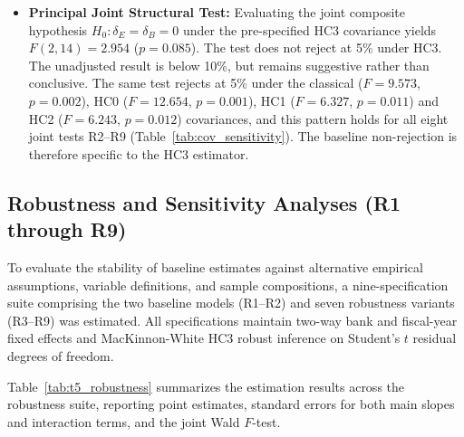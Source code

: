 \begin{itemize}
    \textit{Hypothesis Statement:} The value relevance of book value per share underwent a statistically significant shift following the 2023 consolidation wave ($H_0: \delta_B = 0$ vs.\ $H_1: \delta_B \ne 0$).
    The interaction coefficient is $\hat{\delta}_B = -1.758$ with an HC3 standard error of $1.231$ ($t = -1.43, p = 0.175$). Although the negative shift reduces the implied post-consolidation slope to $-1.658$, the interaction term does not achieve statistical significance at the 5\% level. The study fails to reject the null hypothesis of no structural shift in BVPS value relevance when evaluated in isolation.
    \item \textbf{Principal Joint Structural Test:}
    Evaluating the joint composite hypothesis $H_0: \delta_E = \delta_B = 0$ under the pre-specified HC3 covariance yields $F(2,14)=2.954$ ($p=0.085$). The test does not reject at 5\% under HC3. The unadjusted result is below 10\%, but remains suggestive rather than conclusive. The same test rejects at 5\% under the classical ($F=9.573$, $p=0.002$), HC0 ($F=12.654$, $p=0.001$), HC1 ($F=6.327$, $p=0.011$) and HC2 ($F=6.243$, $p=0.012$) covariances, and this pattern holds for all eight joint tests R2--R9 (Table~\ref{tab:cov_sensitivity}). The baseline non-rejection is therefore specific to the HC3 estimator.
\end{itemize}

\subsection{Robustness and Sensitivity Analyses (R1 through R9)}
\label{subsec:robustness_suite}
To evaluate the stability of baseline estimates against alternative empirical assumptions, variable definitions, and sample compositions, a nine-specification suite comprising the two baseline models (R1--R2) and seven robustness variants (R3--R9) was estimated. All specifications maintain two-way bank and fiscal-year fixed effects and MacKinnon-White HC3 robust inference on Student's $t$ residual degrees of freedom.

Table~\ref{tab:t5_robustness} summarizes the estimation results across the robustness suite, reporting point estimates, standard errors for both main slopes and interaction terms, and the joint Wald $F$-test.

